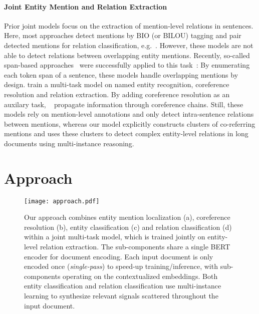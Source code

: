 \documentclass[11pt,a4paper]{article}
\begin{document}
\paragraph{Joint Entity Mention and Relation Extraction}
Prior joint models focus on the extraction of mention-level relations in sentences. Here, most approaches detect mentions by BIO (or BILOU) tagging and pair detected mentions for relation classification, e.g.~\cite{gupta:2016:table_filling, zhou:2017:joint_hybrid, zheng:2017:joint_novel_tagging, bekoulis:2018:multi_head, nguyen:2019:biaffine_attention, miwa:2016:stacked_rnn}. However, these models are not able to detect relations between overlapping entity mentions. Recently, so-called span-based approaches~\cite{lee:2017:span_coreference} were successfully applied to this task~\cite{luan:2018:scierc, eberts:2020:spert}: By enumerating each token span of a sentence, these models handle overlapping mentions by design. \citet{wolf:2018:hierarch_multi_task} train a multi-task model on named entity recognition, coreference resolution and relation extraction. By adding coreference resolution as an auxilary task, ~\citet{luan:2019:span_graphs} propagate information through coreference chains. Still, these models rely on mention-level annotations and only detect intra-sentence relations between mentions, whereas our model explicitly constructs clusters of co-referring mentions and uses these clusters to detect complex entity-level relations in long documents using multi-instance reasoning.

\section{Approach} \label{sec:approach}
\begin{figure*}[ht]
    \centering
    \texttt{[image: approach.pdf]}
    \caption{Our approach combines entity mention localization (a), coreference resolution (b), entity classification (c) and relation classification (d) within a joint multi-task model, which is trained jointly on entity-level relation extraction. The sub-components share a single BERT encoder for document encoding. Each input document is only encoded once (\emph{single-pass}) to speed-up training/inference, with sub-components operating on the contextualized embeddings. Both entity classification and relation classification use multi-instance learning to synthesize relevant signals scattered throughout the input document.}
    \label{fig:approach}
\end{figure*}
\end{document}
